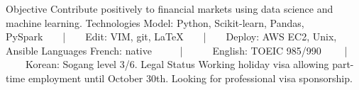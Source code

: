 

\begin{cvskills}

  \cvskill
    {Objective} %
    {Contribute positively to financial markets using data science and machine learning.} %
  \cvskill
    {Technologies} %
    {Model: Python, Scikit-learn, Pandas, PySpark~~~~|~~~~Edit: VIM, git, \LaTeX~~~~|~~~~Deploy: AWS EC2, Unix, Ansible} %
  \cvskill
    {Languages} %
    {French: native ~~~~~|~~~~~~English: TOEIC 985/990 ~~~~|~~~~Korean: Sogang level 3/6.} %
  \cvskill
    {Legal Status} %
    {Working holiday visa allowing part-time employment until October 30th. Looking for professional visa sponsorship.} %
\end{cvskills}
